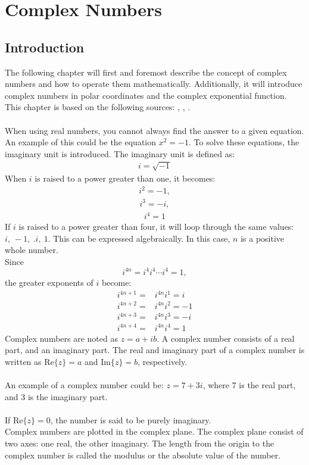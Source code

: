 \chapter{Complex Numbers}

\section{Introduction}
The following chapter will first and foremost describe the concept of complex numbers and how to operate them mathematically. Additionally, it will introduce complex numbers in polar coordinates and the complex exponential function.
\\
This chapter is based on the following sources: \cite{complexpaul}, \cite{complexpurple}, \cite{complexnotebook}.
\\
\\
When using real numbers, you cannot always find the answer to a given equation. An example of this could be the equation $x^2=-1$. To solve these equations, the imaginary unit is introduced. The imaginary unit is defined as:
\begin{align*}
i=\sqrt{-1}
\end{align*}
When $i$ is raised to a power greater than one, it becomes:
\begin{align*}
i^2=-1,
\end{align*}
\begin{align*}
i^3=-i,
\end{align*}
\begin{align*}
i^4=1
\end{align*}
If $i$ is raised to a power greater than four, it will loop through the same values: $i, \ -1, \ .i, \ 1$. This can be expressed algebraically. In this case, $n$ is a  positive whole number. 
\\
Since $$i^{4n} = i^4i^4\cdots i^4 = 1,$$
the greater exponents of $i$ become:
\begin{align*}
	i^{4n+1} =& i^{4n}i^1 = i \\
	i^{4n+2} =& i^{4n}i^2 = -1 \\
	i^{4n+3} =& i^{4n}i^3 = -i \\
	i^{4n+4} =& i^{4n}i^4 = 1
\end{align*}
Complex numbers are noted as $z = a+ib$. A complex number consists of a real part, and an imaginary part. The real and imaginary part of a complex number is written as $\text{Re}\{z\}=a$ and $\text{Im}\{z\}=b$, respectively.
\\
\\
An example of a complex number could be: $z=7+3i$, where 7 is the real part, and 3 is the imaginary part. 
\\
\\
If $\text{Re}\{z\}=0$, the number is said to be purely imaginary.  
\\
Complex numbers are plotted in the complex plane. The complex plane consist of two axes: one real, the other imaginary.
The length from the origin to the complex number is called the modulus or the absolute value of the number.

